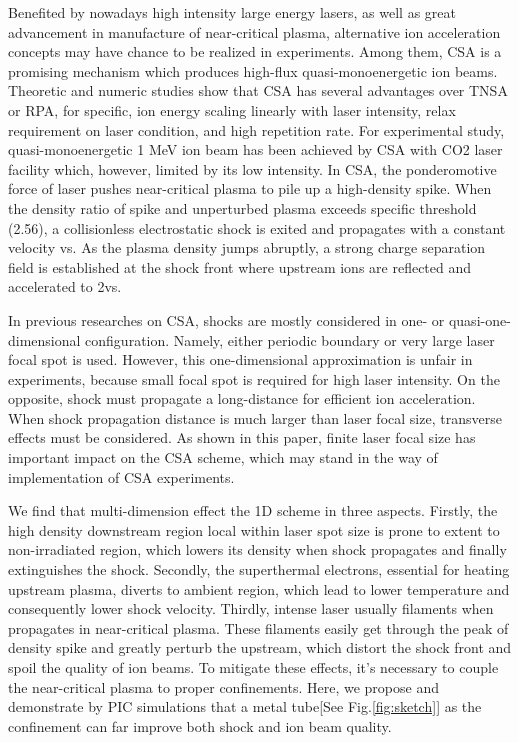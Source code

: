 \documentclass[12pt]{iopart}
\begin{document}
Benefited by nowadays high intensity large energy lasers, as well as great advancement in manufacture of near-critical plasma, alternative ion acceleration concepts may have chance to be realized in experiments. Among them, CSA is a promising mechanism which produces high-flux quasi-monoenergetic ion beams. Theoretic and numeric studies show that CSA has several advantages over TNSA or RPA, for specific, ion energy scaling linearly with laser intensity, relax requirement on laser condition, and high repetition rate. For experimental study, quasi-monoenergetic 1 MeV ion beam has been achieved by CSA with CO2 laser facility which, however, limited by its low intensity. In CSA, the ponderomotive force of laser pushes near-critical plasma to pile up a high-density spike. When the density ratio of spike and unperturbed plasma exceeds specific threshold (2.56)\cite{zhang_quasi-monoenergetic_2016}, a collisionless electrostatic shock is exited and propagates with a constant velocity vs. As the plasma density jumps abruptly, a strong charge separation field is established at the shock front where upstream ions are reflected and accelerated to 2vs.

In previous researches on CSA, shocks are mostly considered in one- or quasi-one-dimensional configuration. Namely, either periodic boundary or very large laser focal spot is used. However, this one-dimensional approximation is unfair in experiments, because small focal spot is required for high laser intensity. On the opposite, shock must propagate a long-distance for efficient ion acceleration. When shock propagation distance is much larger than laser focal size, transverse effects must be considered. As shown in this paper, finite laser focal size has important impact on the CSA scheme, which may stand in the way of implementation of CSA experiments. 

We find that multi-dimension effect the 1D scheme in three aspects. Firstly, the high density downstream region local within laser spot size is prone to extent to non-irradiated region, which lowers its density when shock propagates and finally extinguishes the shock. Secondly, the superthermal electrons, essential for heating upstream plasma, diverts to ambient region, which lead to lower temperature and consequently lower shock velocity. Thirdly, intense laser usually filaments when propagates in near-critical plasma. These filaments easily get through the peak of density spike and greatly perturb the upstream, which distort the shock front and spoil the quality of ion beams. To mitigate these effects, it’s necessary to couple the near-critical plasma to proper confinements. Here, we propose and demonstrate by PIC simulations that a metal tube[See Fig.\ref{fig:sketch}] as the confinement can far improve both shock and ion beam quality.
\end{document}
